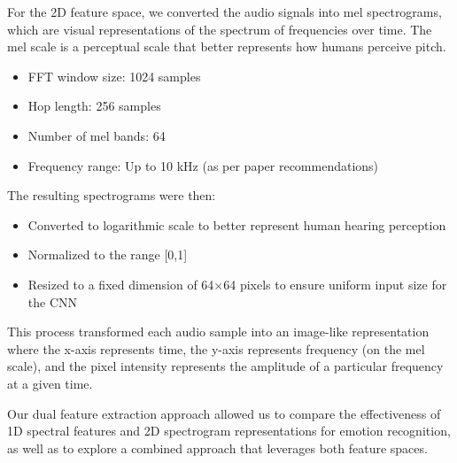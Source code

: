 For the 2D feature space, we converted the audio signals into mel spectrograms, which are visual representations of the spectrum of frequencies over time. The mel scale is a perceptual scale that better represents how humans perceive pitch.

\begin{itemize}
    \item FFT window size: 1024 samples
    \item Hop length: 256 samples
    \item Number of mel bands: 64
    \item Frequency range: Up to 10 kHz (as per paper recommendations)
\end{itemize}

The resulting spectrograms were then:
\begin{itemize}
    \item Converted to logarithmic scale to better represent human hearing perception
    \item Normalized to the range [0,1]
    \item Resized to a fixed dimension of 64×64 pixels to ensure uniform input size for the CNN
\end{itemize}

This process transformed each audio sample into an image-like representation where the x-axis represents time, the y-axis represents frequency (on the mel scale), and the pixel intensity represents the amplitude of a particular frequency at a given time.

Our dual feature extraction approach allowed us to compare the effectiveness of 1D spectral features and 2D spectrogram representations for emotion recognition, as well as to explore a combined approach that leverages both feature spaces. 